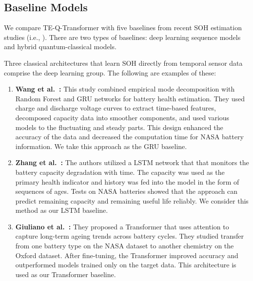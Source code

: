 \documentclass[a4paper,fleqn]{cas-sc}
\begin{document}
\subsection{Baseline Models}\label{sec:baselines}
We compare TE-Q-Transformer with five baselines from recent SOH estimation studies (i.e., \citep{wang2024state, zhang2023accurate, giuliano2025transformer, soon2025hybrid, wang2026prediction}). There are two types of baselines: deep learning sequence models and hybrid quantum-classical models. 

Three classical architectures that learn SOH directly from temporal sensor data comprise the deep learning group. The following are examples of these:  
\begin{enumerate}[label=(\roman*)]
  \item \textbf{Wang et al.~\citep{wang2024state}:} This study combined empirical mode decomposition with Random Forest and GRU networks for battery health estimation.  They used charge and discharge voltage curves to extract time-based features, decomposed capacity data into smoother components, and used various models to the fluctuating and steady parts. This design enhanced the accuracy of the data and decreased the computation time for NASA battery information. We take this approach as the GRU baseline.
  \item \textbf{Zhang et al.~\citep{zhang2023accurate}:} The authors utilized a LSTM network that that monitors the battery capacity degradation with time. The capacity was used as the primary health indicator and history was fed into the model in the form of sequences of ages. Tests on NASA batteries showed that the approach can predict remaining capacity and remaining useful life reliably. We consider this method as our LSTM baseline.
  \item \textbf{Giuliano et al.~\citep{giuliano2025transformer}:} They proposed a Transformer that uses attention to capture long-term ageing trends across battery cycles. They studied transfer from one battery type on the NASA dataset to another chemistry on the Oxford dataset. After fine-tuning, the Transformer improved accuracy and outperformed models trained only on the target data. This architecture is used as our Transformer baseline.
\end{enumerate}
\end{document}
